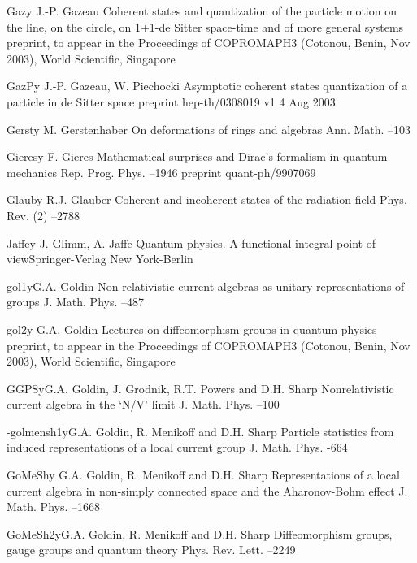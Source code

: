 \documentclass[11pt]{amsart}
\numberwithin{equation}{section}
\theoremstyle{remark}
\newcommand{\by}{\mathbf y}
\begin{document}
\begin{thebibliography}{199}
 Gaz\by{ J.-P. Gazeau \paper Coherent states and  quantization of the
particle motion on the line, on the circle, on 1+1-de Sitter space-time and of
more general systems \paperinfo preprint, to appear in the Proceedings of
COPROMAPH3 (Cotonou, Benin, Nov 2003), World Scientific, Singapore}

 GazP\by{ J.-P. Gazeau, W. Piechocki \paper Asymptotic coherent states
quantization of a particle in de Sitter space \paperinfo preprint
hep-th/0308019 v1 4 Aug 2003}

 Gerst\by{ M. Gerstenhaber \paper On deformations of rings and algebras
\jour Ann. Math.   --103}

 Gieres\by{ F. Gieres \paper Mathematical surprises and Dirac's formalism
in quantum mechanics \jour Rep. Prog. Phys.   --1946
\paperinfo preprint quant-ph/9907069}

 Glaub\by{ R.J. Glauber \paper Coherent and incoherent states of the
radiation field \jour Phys. Rev. (2)   --2788}

 Jaffe\by{ J. Glimm, A. Jaffe \book Quantum physics. A functional
integral point of view\publ Springer-Verlag \publaddr New York-Berlin}

 gol1\by{G.A. Goldin \paper Non-relativistic current algebras as unitary representations of
groups \jour J. Math. Phys.   --487}

 gol2\by{ G.A. Goldin \paper Lectures on diffeomorphism groups in
quantum physics \paperinfo preprint, to appear in the Proceedings of
COPROMAPH3 (Cotonou, Benin, Nov 2003), World Scientific, Singapore}

 GGPS\by{G.A. Goldin, J. Grodnik, R.T. Powers and D.H. Sharp
\paper Nonrelativistic current algebra in the `N/V' limit
\jour J. Math. Phys.   --100}

 -golmensh1\by{G.A. Goldin, R. Menikoff and D.H. Sharp \paper Particle
statistics from induced representations of a local current group \jour J. Math.
Phys.   -664}

 GoMeSh\by{ G.A. Goldin, R. Menikoff and D.H. Sharp \paper Representations of
a local current algebra in  non-simply connected space and the Aharonov-Bohm
effect \jour J. Math. Phys.   --1668}

 GoMeSh2\by{G.A. Goldin, R. Menikoff and D.H. Sharp \paper Diffeomorphism groups,
gauge groups and quantum theory \jour Phys. Rev. Lett.   --2249}



\end{thebibliography}
\end{document}
